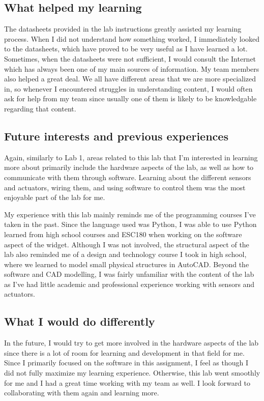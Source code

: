 \documentclass[11pt]{article}
\begin{document}
\subsection{What helped my learning}
The datasheets provided in the lab instructions greatly assisted my learning process. When I did not understand how something worked, I immediately looked to the datasheets, which have proved to be very useful as I have learned a lot. Sometimes, when the datasheets were not sufficient, I would consult the Internet which has always been one of my main sources of information. My team members also helped a great deal. We all have different areas that we are more specialized in, so whenever I
encountered struggles in understanding content, I would often ask for help from my team since usually one of them is likely to be knowledgable regarding that content.


\subsection{Future interests and previous experiences}
Again, similarly to Lab 1, areas related to this lab that I’m interested in learning more about primarily include the hardware aspects of the lab, as well as how to communicate with them through software. Learning about the different sensors and actuators, wiring them, and using software to control them was the most enjoyable part of the lab for me.

My experience with this lab mainly reminds me of the programming courses I've taken in the past. Since the language used was Python, I was able to use Python learned from high school courses and ESC180 when working on the software aspect of the widget. Although I was not involved, the structural aspect of the lab also reminded me of a design and technology course I took in high school, where we learned to model small physical structures in AutoCAD. Beyond the software and CAD modelling, I was fairly unfamiliar with the content of the lab as I've had little academic and professional experience working with sensors and actuators. 

\subsection{What I would do differently}
In the future, I would try to get more involved in the hardware aspects of the lab since there is a lot of room for learning and development in that field for me. Since I primarily focused on the software in this assignment, I feel as though I did not fully maximize my learning experience. Otherwise, this lab went smoothly for me and I had a great time working with my team as well. I look forward to collaborating with them again and learning more.
\end{document}
